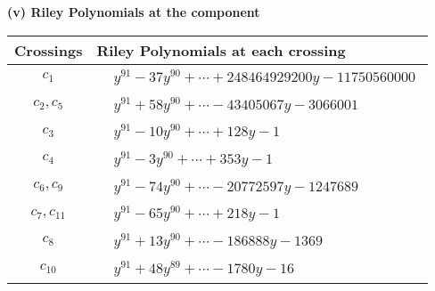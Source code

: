 \documentclass[1p]{elsarticle_modified}
\theoremstyle{definition}
\begin{document}
\newpage\renewcommand{\arraystretch}{1}
\flushleft \textbf{(v) Riley Polynomials at the component}\newline \\
\begin{tabular}{m{50pt}|m{274pt}}
Crossings & \hspace{64pt}Riley Polynomials at each crossing \\
\hline $$\begin{aligned}c_{1}\end{aligned}$$&$\begin{aligned}
&y^{91}-37 y^{90}+\cdots+248464929200 y-11750560000
\end{aligned}$\\
\hline $$\begin{aligned}c_{2},c_{5}\end{aligned}$$&$\begin{aligned}
&y^{91}+58 y^{90}+\cdots-43405067 y-3066001
\end{aligned}$\\
\hline $$\begin{aligned}c_{3}\end{aligned}$$&$\begin{aligned}
&y^{91}-10 y^{90}+\cdots+128 y-1
\end{aligned}$\\
\hline $$\begin{aligned}c_{4}\end{aligned}$$&$\begin{aligned}
&y^{91}-3 y^{90}+\cdots+353 y-1
\end{aligned}$\\
\hline $$\begin{aligned}c_{6},c_{9}\end{aligned}$$&$\begin{aligned}
&y^{91}-74 y^{90}+\cdots-20772597 y-1247689
\end{aligned}$\\
\hline $$\begin{aligned}c_{7},c_{11}\end{aligned}$$&$\begin{aligned}
&y^{91}-65 y^{90}+\cdots+218 y-1
\end{aligned}$\\
\hline $$\begin{aligned}c_{8}\end{aligned}$$&$\begin{aligned}
&y^{91}+13 y^{90}+\cdots-186888 y-1369
\end{aligned}$\\
\hline $$\begin{aligned}c_{10}\end{aligned}$$&$\begin{aligned}
&y^{91}+48 y^{89}+\cdots-1780 y-16
\end{aligned}$\\
\hline
\end{tabular}\\~\\
\end{document}
